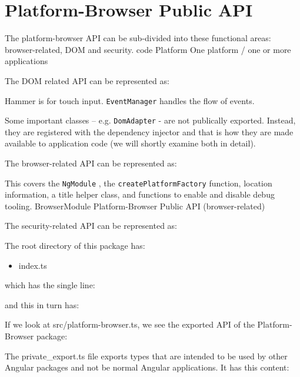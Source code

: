 \section{Platform-Browser Public API}

The platform-browser API can be sub-divided into these functional areas:
browser-related, DOM and security.
code
Platform
One platform / one or more applications

The DOM related API can be represented as:

Hammer is for touch input.
\texttt{EventManager}
handles the flow of events.

Some important classes – e.g.
\texttt{DomAdapter}
- are not publically exported. Instead, they
are registered with the dependency injector and that is how they are made available
to application code (we will shortly examine both in detail).

The browser-related API can be represented as:

This covers the
\texttt{NgModule}
, the
\texttt{createPlatformFactory}
function, location information,
a title helper class, and functions to enable and disable debug tooling.
BrowserModule
Platform-Browser Public API (browser-related)

The security-related API can be represented as:

The root directory of this package has:

\begin{itemize}
  \item index.ts
\end{itemize}

which has the single line:



and this in turn has:



If we look at src/platform-browser.ts, we see the exported API of the Platform-
Browser package:



The private\_export.ts file exports types that are intended to be used by other Angular
packages and not be normal Angular applications. It has this content:


